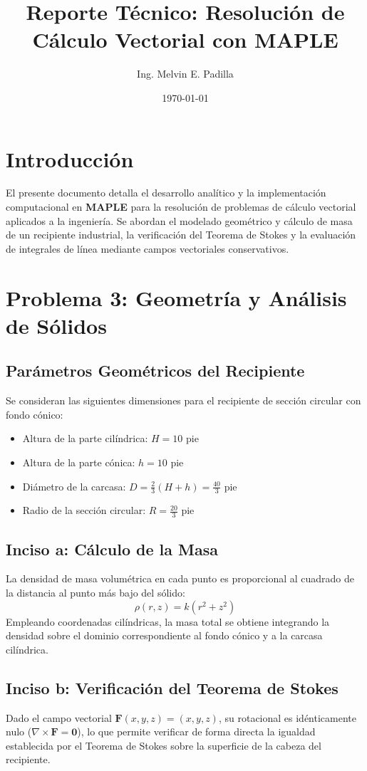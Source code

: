 \documentclass[11pt,a4paper]{article}
\title{\textbf{Reporte Técnico: Resolución de Cálculo Vectorial con MAPLE}}
\author{Ing. Melvin E. Padilla}
\date{\today}
\begin{document}
\maketitle

\section{Introducción}
El presente documento detalla el desarrollo analítico y la implementación computacional en \textbf{MAPLE} para la resolución de problemas de cálculo vectorial aplicados a la ingeniería. Se abordan el modelado geométrico y cálculo de masa de un recipiente industrial, la verificación del Teorema de Stokes y la evaluación de integrales de línea mediante campos vectoriales conservativos.

\section{Problema 3: Geometría y Análisis de Sólidos}
\subsection{Parámetros Geométricos del Recipiente}
Se consideran las siguientes dimensiones para el recipiente de sección circular con fondo cónico:
\begin{itemize}
    \item Altura de la parte cilíndrica: $H = 10\text{ pie}$
    \item Altura de la parte cónica: $h = 10\text{ pie}$
    \item Diámetro de la carcasa: $D = \frac{2}{3}(H + h) = \frac{40}{3}\text{ pie}$
    \item Radio de la sección circular: $R = \frac{20}{3}\text{ pie}$
\end{itemize}

\subsection{Inciso a: Cálculo de la Masa}
La densidad de masa volumétrica en cada punto es proporcional al cuadrado de la distancia al punto más bajo del sólido:
$$\rho(r, z) = k(r^2 + z^2)$$
Empleando coordenadas cilíndricas, la masa total se obtiene integrando la densidad sobre el dominio correspondiente al fondo cónico y a la carcasa cilíndrica.

\subsection{Inciso b: Verificación del Teorema de Stokes}
Dado el campo vectorial $\mathbf{F}(x,y,z) = (x,y,z)$, su rotacional es idénticamente nulo ($\nabla \times \mathbf{F} = \mathbf{0}$), lo que permite verificar de forma directa la igualdad establecida por el Teorema de Stokes sobre la superficie de la cabeza del recipiente.
\end{document}
